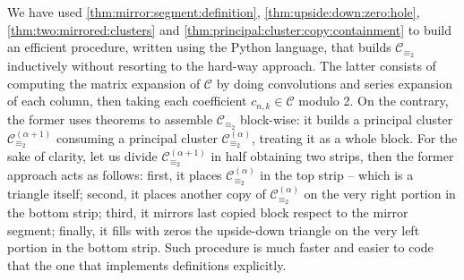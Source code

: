 We have used \autoref{thm:mirror:segment:definition},
\autoref{thm:upside:down:zero:hole}, \autoref{thm:two:mirrored:clusters} and
\autoref{thm:principal:cluster:copy:containment} to build an efficient
procedure, written using the Python language, that builds $\mathcal{C}_{\equiv_{2}}$
inductively without resorting to the hard-way approach. The latter consists of 
computing the matrix expansion of $\mathcal{C}$ by doing convolutions and 
series expansion of each column, then taking each coefficient $c_{n,k}\in\mathcal{C}$ modulo 2. 
On the contrary, the former uses theorems to 
assemble $\mathcal{C}_{\equiv_{2}}$ block-wise: it builds a principal cluster 
$\mathcal{C}_{\equiv_{2}}^{(\alpha+1)}$ consuming a principal cluster 
$\mathcal{C}_{\equiv_{2}}^{(\alpha)}$, treating it as a whole block. For the sake of clarity,
let us divide $\mathcal{C}_{\equiv_{2}}^{(\alpha+1)}$ in half obtaining two strips, then the former approach acts as follows:
first, it places $\mathcal{C}_{\equiv_{2}}^{(\alpha)}$ in the top strip -- which is a triangle itself; 
second, it places another copy of $\mathcal{C}_{\equiv_{2}}^{(\alpha)}$ on the very right portion in the bottom strip;
third, it mirrors last copied block respect to the mirror segment; 
finally, it fills with zeros the upside-down triangle on the very left portion in the bottom strip. 
Such procedure is much faster and easier to code that the one that implements definitions explicitly.
